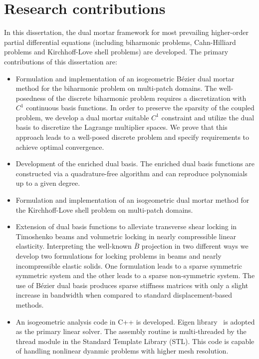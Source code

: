 \section{Research contributions}

In this dissertation, the dual mortar framework for most prevailing higher-order partial differential equations (including biharmonic problems, Cahn-Hilliard problems and Kirchhoff-Love shell problems) are developed. The primary contributions of this dissertation are:
\begin{itemize}
    \item Formulation and implementation of an isogeometric B\'ezier dual mortar method for the biharmonic problem on multi-patch domains. The well-posedness of the discrete biharmonic problem requires a discretization with $C^1$ continuous basis functions. In order to preserve the sparsity of the coupled problem, we develop a dual mortar suitable $C^1$ constraint and utilize the \Bezier dual basis to discretize the Lagrange multiplier spaces. We prove that this approach leads to a well-posed discrete problem and specify requirements to achieve optimal convergence. 
    \item Development of the enriched \Bezier dual basis. The enriched \Bezier dual basis functions are constructed via a quadrature-free algorithm and can reproduce polynomials up to a given degree. 
    \item Formulation and implementation of an isogeometric \Bezier dual mortar method for the Kirchhoff-Love shell problem on multi-patch domains. 
    \item Extension of \Bezier dual basis functions to alleviate transverse shear locking in Timoshenko beams and volumetric locking in nearly compressible linear elasticity. Interpreting the well-known $\bar{B}$ projection in two different ways we develop two formulations for locking problems in beams and nearly incompressible elastic solids.  One formulation leads to a sparse symmetric symmetric system and the other leads to a sparse non-symmetric system. The use of B\'ezier dual basis produces sparse stiffness matrices with only a slight increase in bandwidth when compared to standard displacement-based methods. 
    \item An isogeometric analysis code in C++ is developed. Eigen library~\cite{eigenweb} is adopted as the primary linear solver. The assembly routine is multi-threaded by the thread module in the Standard Template Library (STL). This code is capable of handling nonlinear dyanmic problems with higher mesh resolution. 
\end{itemize}

